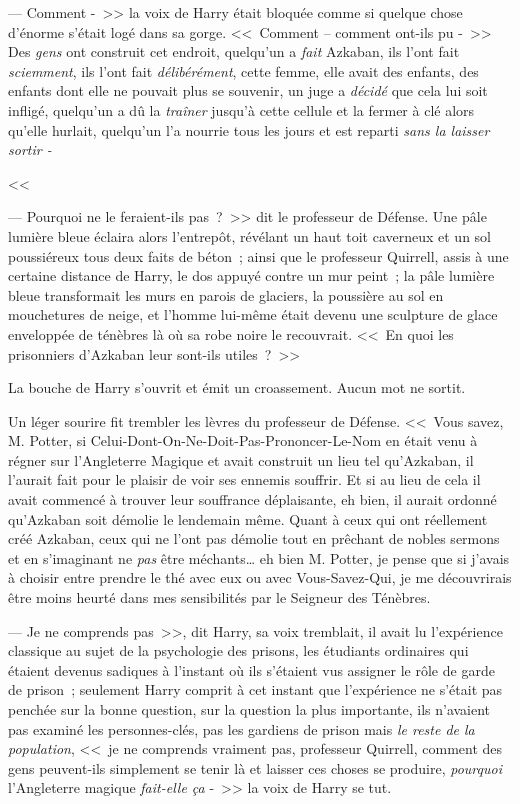 --- Comment -~>> la voix de Harry était bloquée comme si quelque chose d'énorme s'était logé dans sa gorge. <<~Comment -- comment ont-ils pu -~>> Des \emph{gens} ont construit cet endroit, quelqu'un a \emph{fait} Azkaban, ils l'ont fait \emph{sciemment}, ils l'ont fait \emph{délibérément}, cette femme, elle avait des enfants, des enfants dont elle ne pouvait plus se souvenir, un juge a \emph{décidé} que cela lui soit infligé, quelqu'un a dû la \emph{traîner} jusqu'à cette cellule et la fermer à clé alors qu'elle hurlait, quelqu'un l'a nourrie tous les jours et est reparti \emph{sans la laisser sortir -}

<<~

--- Pourquoi ne le feraient-ils pas~?~>> dit le professeur de Défense. Une pâle lumière bleue éclaira alors l'entrepôt, révélant un haut toit caverneux et un sol poussiéreux tous deux faits de béton~; ainsi que le professeur Quirrell, assis à une certaine distance de Harry, le dos appuyé contre un mur peint~; la pâle lumière bleue transformait les murs en parois de glaciers, la poussière au sol en mouchetures de neige, et l'homme lui-même était devenu une sculpture de glace enveloppée de ténèbres là où sa robe noire le recouvrait. <<~En quoi les prisonniers d'Azkaban leur sont-ils utiles~?~>>

La bouche de Harry s'ouvrit et émit un croassement. Aucun mot ne sortit.

Un léger sourire fit trembler les lèvres du professeur de Défense. <<~Vous savez, M. Potter, si Celui-Dont-On-Ne-Doit-Pas-Prononcer-Le-Nom en était venu à régner sur l'Angleterre Magique et avait construit un lieu tel qu'Azkaban, il l'aurait fait pour le plaisir de voir ses ennemis souffrir. Et si au lieu de cela il avait commencé à trouver leur souffrance déplaisante, eh bien, il aurait ordonné qu'Azkaban soit démolie le lendemain même. Quant à ceux qui ont réellement créé Azkaban, ceux qui ne l'ont pas démolie tout en prêchant de nobles sermons et en s'imaginant ne \emph{pas} être méchants… eh bien M. Potter, je pense que si j'avais à choisir entre prendre le thé avec eux ou avec Vous-Savez-Qui, je me découvrirais être moins heurté dans mes sensibilités par le Seigneur des Ténèbres.

--- Je ne comprends pas~>>, dit Harry, sa voix tremblait, il avait lu l'expérience classique au sujet de la psychologie des prisons, les étudiants ordinaires qui étaient devenus sadiques à l'instant où ils s'étaient vus assigner le rôle de garde de prison~; seulement Harry comprit à cet instant que l'expérience ne s'était pas penchée sur la bonne question, sur la question la plus importante, ils n'avaient pas examiné les personnes-clés, pas les gardiens de prison mais \emph{le reste de la population}, <<~je ne comprends vraiment pas, professeur Quirrell, comment des gens peuvent-ils simplement se tenir là et laisser ces choses se produire, \emph{pourquoi} l'Angleterre magique \emph{fait-elle ça} -~>> la voix de Harry se tut.

